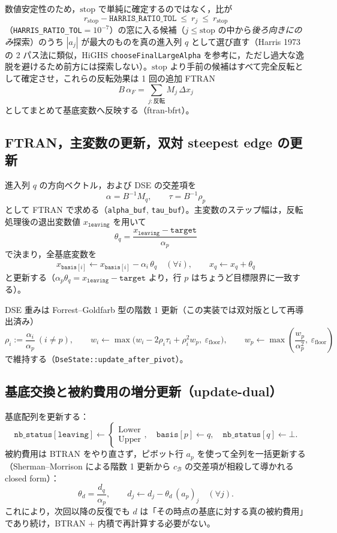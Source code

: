\documentclass[11pt,a4paper]{ltjsarticle}
\newcommand{\code}[1]{\texttt{#1}}
\begin{document}
数値安定性のため，$\mathrm{stop}$ で単純に確定するのではなく，比が
\[
  r_{\mathrm{stop}} - \code{HARRIS\_RATIO\_TOL} \ \le\ r_j \ \le\ r_{\mathrm{stop}}
\]
（\code{HARRIS\_RATIO\_TOL}$=10^{-7}$）の窓に入る候補（$j \le \mathrm{stop}$ の中から\emph{後ろ向きにのみ}探索）のうち $|a_j|$ が最大のものを真の進入列 $q$ として選び直す（Harris 1973 の 2 パス法に類似，HiGHS \code{chooseFinalLargeAlpha} を参考に，ただし過大な逸脱を避けるため前方には探索しない）。$\mathrm{stop}$ より手前の候補はすべて完全反転として確定させ，これらの反転効果は 1 回の追加 FTRAN
\[
  B\, \alpha_F = \sum_{j: \text{反転}} M_j\, \Delta x_j
\]
としてまとめて基底変数へ反映する（ftran-bfrt）。

\subsection{FTRAN，主変数の更新，双対 steepest edge の更新}

進入列 $q$ の方向ベクトル，および DSE の交差項を
\[
  \alpha = B^{-1} M_q, \qquad \tau = B^{-1}\rho_p
\]
として FTRAN で求める（\code{alpha\_buf}, \code{tau\_buf}）。主変数のステップ幅は，反転処理後の退出変数値 $x_{\code{leaving}}$ を用いて
\[
  \theta_q = \frac{x_{\code{leaving}} - \code{target}}{\alpha_p}
\]
で決まり，全基底変数を
\[
  x_{\code{basis}[i]} \leftarrow x_{\code{basis}[i]} - \alpha_i\,\theta_q \quad(\forall i), \qquad x_q \leftarrow x_q + \theta_q
\]
と更新する（$\alpha_p\theta_q = x_{\code{leaving}}-\code{target}$ より，行 $p$ はちょうど目標限界に一致する）。

DSE 重みは Forrest--Goldfarb 型の階数 1 更新（この実装では双対版として再導出済み）
\[
  \rho_i := \frac{\alpha_i}{\alpha_p}\ (i\ne p),\qquad
  w_i \leftarrow \max\!\bigl(w_i - 2\rho_i \tau_i + \rho_i^2 w_p,\ \varepsilon_{\mathrm{floor}}\bigr),\qquad
  w_p \leftarrow \max\!\left(\frac{w_p}{\alpha_p^2},\ \varepsilon_{\mathrm{floor}}\right)
\]
で維持する（\code{DseState::update\_after\_pivot}）。

\subsection{基底交換と被約費用の増分更新（update-dual）}

基底配列を更新する：
\[
  \code{nb\_status}[\code{leaving}] \leftarrow \begin{cases}\mathrm{Lower}\\ \mathrm{Upper}\end{cases},\quad
  \code{basis}[p] \leftarrow q,\quad \code{nb\_status}[q] \leftarrow \bot .
\]
被約費用は BTRAN をやり直さず，ピボット行 $a_p$ を使って全列を一括更新する（Sherman--Morrison による階数 1 更新から $c_{\mathcal B}$ の交差項が相殺して導かれる closed form）：
\[
  \theta_d = \frac{d_q}{\alpha_p}, \qquad d_j \leftarrow d_j - \theta_d\, (a_p)_j \quad (\forall j).
\]
これにより，次回以降の反復でも $d$ は「その時点の基底に対する真の被約費用」であり続け，BTRAN + 内積で再計算する必要がない。
\end{document}
